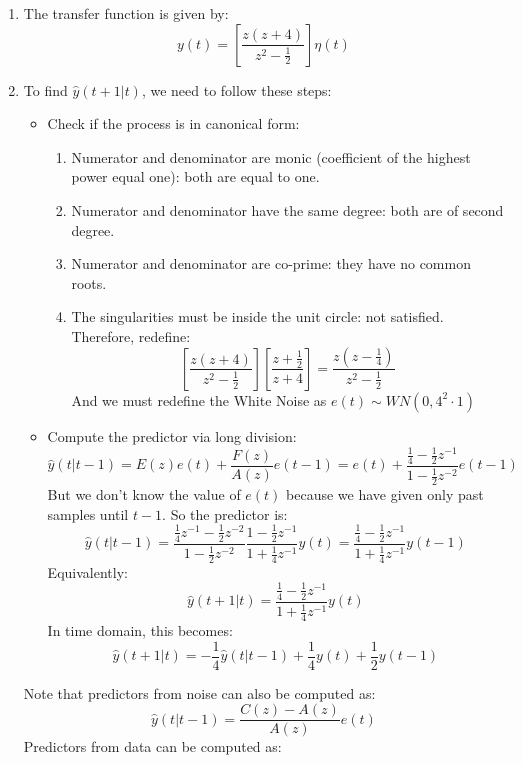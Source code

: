\begin{enumerate}
    \item The transfer function is given by:
        \[y(t)=\left[\dfrac{z(z+4)}{z^2-\frac{1}{2}}\right]\eta(t)\]
    \item To find $\hat{y}(t+1|t)$, we need to follow these steps:
        \begin{itemize}
            \item Check if the process is in canonical form:
                \begin{enumerate}
                    \item Numerator and denominator are monic (coefficient of the highest power equal one): both are equal to one.
                    \item Numerator and denominator have the same degree: both are of second degree.
                    \item Numerator and denominator are co-prime: they have no common roots.
                    \item The singularities must be inside the unit circle: not satisfied. 
                        Therefore, redefine: 
                        \[\left[\dfrac{z(z+4)}{z^2-\frac{1}{2}}\right]\left[\dfrac{z+\frac{1}{2}}{z+4}\right]=\dfrac{z\left(z-\frac{1}{4}\right)}{z^{2}-\frac{1}{2}}\]
                        And we must redefine the  White Noise as $e(t)\sim WN(0,4^2\cdot 1)$
                \end{enumerate}
            \item Compute the predictor via long division:
                \[\hat{y}(t|t-1)=E(z)e(t)+\dfrac{F(z)}{A(z)}e(t-1)=e(t)+\dfrac{\frac{1}{4}-\frac{1}{2}z^{-1}}{1-\frac{1}{2}z^{-2}}e(t-1)\]
                But we don't know the value of $e(t)$ because we have given only past samples until $t-1$.
                So the predictor is: 
                \[\hat{y}(t|t-1)=\dfrac{\frac{1}{4}z^{-1}-\frac{1}{2}z^{-2}}{1-\frac{1}{2}z^{-2}}\dfrac{1-\frac{1}{2}z^{-1}}{1+\frac{1}{4}z^{-1}}y(t)=\dfrac{\frac{1}{4}-\frac{1}{2}z^{-1}}{1+\frac{1}{4}z^{-1}}y(t-1)\]
                Equivalently: 
                \[\hat{y}(t+1|t)=\dfrac{\frac{1}{4}-\frac{1}{2}z^{-1}}{1+\frac{1}{4}z^{-1}}y(t)\]
                In time domain, this becomes:
                \[\hat{y}(t+1|t)=-\dfrac{1}{4}\hat{y}(t|t-1)+\dfrac{1}{4}y(t)+\dfrac{1}{2}y(t-1)\]
        \end{itemize}
        Note that predictors from noise can also be computed as:
        \[\hat{y}(t|t-1)=\dfrac{C(z)-A(z)}{A(z)}e(t)\]
        Predictors from data can be computed as:

\end{enumerate}
